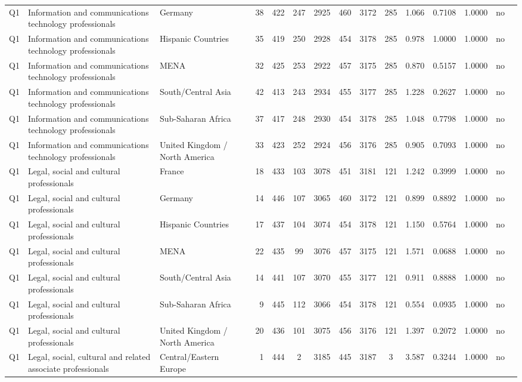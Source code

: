 \begin{longtable}{lllrcccccccccll}
Q1 & Information and communications technology professionals & Germany & 38 & 422 & 247 & 2925 & 460 & 3172 & 285 & 1.066 & 0.7108 & 1.0000 & no \\
Q1 & Information and communications technology professionals & Hispanic Countries & 35 & 419 & 250 & 2928 & 454 & 3178 & 285 & 0.978 & 1.0000 & 1.0000 & no \\
Q1 & Information and communications technology professionals & MENA & 32 & 425 & 253 & 2922 & 457 & 3175 & 285 & 0.870 & 0.5157 & 1.0000 & no \\
Q1 & Information and communications technology professionals & South/Central Asia & 42 & 413 & 243 & 2934 & 455 & 3177 & 285 & 1.228 & 0.2627 & 1.0000 & no \\
Q1 & Information and communications technology professionals & Sub-Saharan Africa & 37 & 417 & 248 & 2930 & 454 & 3178 & 285 & 1.048 & 0.7798 & 1.0000 & no \\
Q1 & Information and communications technology professionals & United Kingdom / North America & 33 & 423 & 252 & 2924 & 456 & 3176 & 285 & 0.905 & 0.7093 & 1.0000 & no \\
Q1 & Legal, social and cultural professionals & France & 18 & 433 & 103 & 3078 & 451 & 3181 & 121 & 1.242 & 0.3999 & 1.0000 & no \\
Q1 & Legal, social and cultural professionals & Germany & 14 & 446 & 107 & 3065 & 460 & 3172 & 121 & 0.899 & 0.8892 & 1.0000 & no \\
Q1 & Legal, social and cultural professionals & Hispanic Countries & 17 & 437 & 104 & 3074 & 454 & 3178 & 121 & 1.150 & 0.5764 & 1.0000 & no \\
Q1 & Legal, social and cultural professionals & MENA & 22 & 435 & 99 & 3076 & 457 & 3175 & 121 & 1.571 & 0.0688 & 1.0000 & no \\
Q1 & Legal, social and cultural professionals & South/Central Asia & 14 & 441 & 107 & 3070 & 455 & 3177 & 121 & 0.911 & 0.8888 & 1.0000 & no \\
Q1 & Legal, social and cultural professionals & Sub-Saharan Africa & 9 & 445 & 112 & 3066 & 454 & 3178 & 121 & 0.554 & 0.0935 & 1.0000 & no \\
Q1 & Legal, social and cultural professionals & United Kingdom / North America & 20 & 436 & 101 & 3075 & 456 & 3176 & 121 & 1.397 & 0.2072 & 1.0000 & no \\
Q1 & Legal, social, cultural and related associate professionals & Central/Eastern Europe & 1 & 444 & 2 & 3185 & 445 & 3187 & 3 & 3.587 & 0.3244 & 1.0000 & no \\

\end{longtable}
